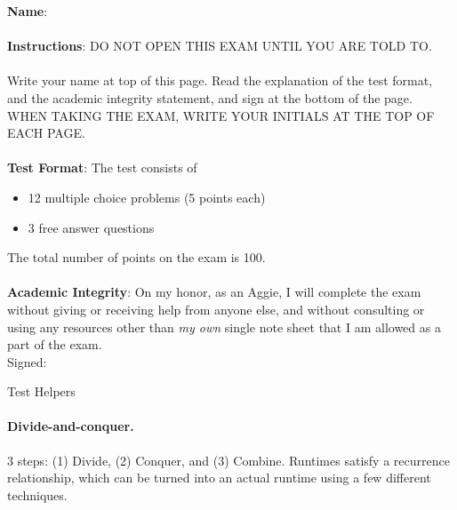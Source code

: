\documentclass[11  pt]{exam}
\newcommand{\hide}[1]{\underline{\phantom{#1 #1}}}
\begin{document}
	\begin{center}
	\end{center}
	
	\noindent\textbf{Name}: \hide{your name here}  \\ \\
	
	\noindent\textbf{Instructions}: DO NOT OPEN THIS EXAM UNTIL YOU ARE TOLD TO. \\ \\
	
	\noindent Write your name at top of this page. Read the explanation of the test format, and the academic integrity statement, and sign at the bottom of the page. WHEN TAKING THE EXAM, WRITE YOUR INITIALS AT THE TOP OF EACH PAGE.\\ \\
	
	\noindent\textbf{Test Format}: The test consists of 
	
	\begin{itemize}
		\item 12 multiple choice problems (5 points each)
		\item 3 free answer questions
	\end{itemize}
	The total number of points on the exam is 100. \\ \\
	
	\noindent\textbf{Academic Integrity}: On my honor, as an Aggie, I will complete the exam without giving or receiving help from anyone else, and without consulting or using any resources other than \emph{my own} single note sheet that I am allowed as a part of the exam. \\
	
	\noindent Signed: \hide{your signature here} \\
	

	

	\newpage
	\noindent \begin{center}Test Helpers\end{center}
	\paragraph{Divide-and-conquer.} 3 steps: (1) Divide, (2) Conquer, and (3) Combine. Runtimes satisfy a recurrence relationship, which can be turned into an actual runtime using a few different techniques.
	
\end{document}
